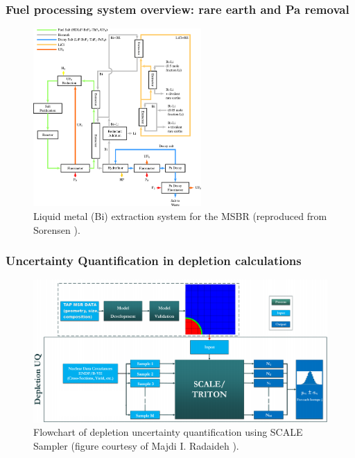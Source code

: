 \documentclass[9pt]{beamer}
\begin{document}
\begin{frame}
\frametitle{Fuel processing system overview: rare earth and Pa removal}
		\vspace{-2mm}
	\begin{figure}[htp!] %
		\centering
			\includegraphics[width=0.57\textwidth]{../dissertation/figures/ch2/flowsheet.pdf}
			\vspace{-2mm}
		\caption{Liquid metal (Bi) extraction system for the \gls{MSBR} 
		(reproduced from Sorensen \cite{sorensen_one-fluid_2006}).} 
	\end{figure}
\end{frame}

\begin{frame}
\frametitle{Uncertainty Quantification in depletion calculations}
\vspace{-2mm}
\begin{figure}[htp!] %
	\centering
	\includegraphics[width=1.05\textwidth]{../dissertation/figures/uq/majdi_scale_scheme.png}
	\vspace{-2mm}
	\caption{Flowchart of depletion uncertainty quantification 
		using SCALE Sampler (figure courtesy of Majdi I. Radaideh 
		\cite{radaideh_novel_2019}).} 
\end{figure}
\end{frame}
\end{document}
